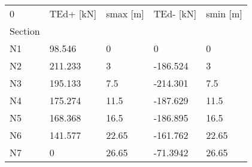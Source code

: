 \begin{tabular}{lllll}
\toprule
0 & TEd+ [kN] & smax [m] & TEd- [kN] & smin [m] \\
Section &           &          &           &          \\
\midrule
N1      &    98.546 &        0 &         0 &        0 \\
N2      &   211.233 &        3 &  -186.524 &        3 \\
N3      &   195.133 &      7.5 &  -214.301 &      7.5 \\
N4      &   175.274 &     11.5 &  -187.629 &     11.5 \\
N5      &   168.368 &     16.5 &  -186.895 &     16.5 \\
N6      &   141.577 &    22.65 &  -161.762 &    22.65 \\
N7      &         0 &    26.65 &  -71.3942 &    26.65 \\
\bottomrule
\end{tabular}
